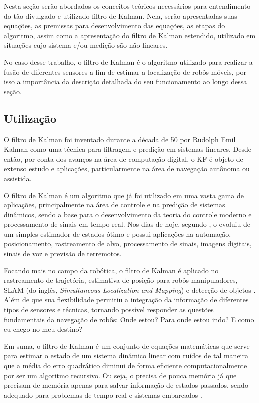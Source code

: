\documentclass[acronym, symbols, table, deposito]{fei}
\begin{document}
		Nesta seção serão abordados os conceitos teóricos necessários para entendimento do tão divulgado e utilizado filtro de Kalman. Nela, serão apresentadas suas equações, as premissas para desenvolvimento das equações, as etapas do algoritmo, assim como a apresentação do filtro de Kalman estendido, utilizado em situações cujo sistema e/ou medição são não-lineares. 
		
		No caso desse trabalho, o filtro de Kalman é o algoritmo utilizado para realizar a fusão de diferentes sensores a fim de estimar a localização de robôs móveis, por isso a importância da descrição detalhada do seu funcionamento ao longo dessa seção.
		
		\subsection{Utilização}
		
			O filtro de Kalman foi inventado durante a década de 50 por Rudolph Emil Kalman como uma técnica para filtragem e predição em sistemas lineares. Desde então, por conta dos avanços na área de computação digital, o KF é objeto de extenso estudo e aplicações, particularmente na área de navegação autônoma ou assistida.
			
			O filtro de Kalman é um algoritmo que já foi utilizado em uma vasta gama de aplicações, principalmente na área de controle e na predição de sistemas dinâmicos, sendo a base para o desenvolvimento da teoria do controle moderno e processamento de sinais em tempo real. Nos dias de hoje, segundo \textcite{khodarahmi2023review}, o  evoluiu de um simples estimador de estados ótimo e possui aplicações na automação, posicionamento, rastreamento de alvo, processamento de sinais, imagens digitais, sinais de voz e previsão de terremotos.
			
			Focando mais no campo da robótica, o filtro de Kalman é aplicado no rastreamento de trajetória, estimativa de posição para robôs manipuladores, SLAM (do inglês, \textit{Simultaneous Localization and Mapping}) e detecção de objetos \cite{urrea2021kalman}. Além de que sua flexibilidade permitiu a integração da informação de diferentes tipos de sensores e técnicas, tornando possível responder as questões fundamentais da navegação de robôs: Onde estou? Para onde estou indo? E como eu chego no meu destino?
			
			Em suma, o filtro de Kalman é um conjunto de equações matemáticas que serve para estimar o estado de um sistema dinâmico linear com ruídos de tal maneira que a média do erro quadrático diminui de forma eficiente computacionalmente por ser um algoritmo recursivo. Ou seja, o  precisa de pouca memória já que precisam de memória apenas para salvar informação de estados passados, sendo adequado para problemas de tempo real e sistemas embarcados \cite{khodarahmi2023review}.
			
\end{document}
